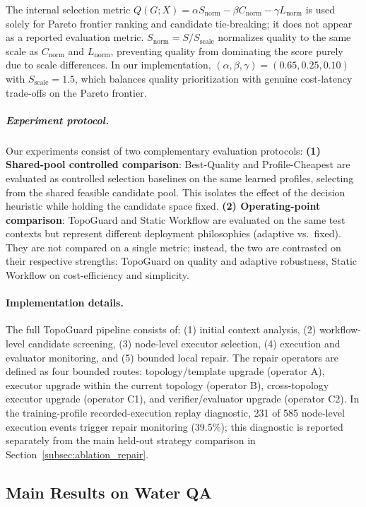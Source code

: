 \documentclass[acmsmall,review,anonymous]{acmart}
\begin{document}
The internal selection metric $Q(G;X)=\alpha S_{\text{norm}}-\beta C_{\text{norm}}-\gamma L_{\text{norm}}$ is used solely for Pareto frontier ranking and candidate tie-breaking; it does not appear as a reported evaluation metric. $S_{\text{norm}}=S / S_{\text{scale}}$ normalizes quality to the same scale as $C_{\text{norm}}$ and $L_{\text{norm}}$, preventing quality from dominating the score purely due to scale differences. In our implementation, $(\alpha,\beta,\gamma)=(0.65,0.25,0.10)$ with $S_{\text{scale}}=1.5$, which balances quality prioritization with genuine cost-latency trade-offs on the Pareto frontier.

\subparagraph{Experiment protocol.}\label{subsubsec:exp_protocol}
Our experiments consist of two complementary evaluation protocols:
\textbf{(1) Shared-pool controlled comparison}: Best-Quality and Profile-Cheapest are evaluated as controlled selection baselines on the same learned profiles, selecting from the shared feasible candidate pool. This isolates the effect of the decision heuristic while holding the candidate space fixed.
\textbf{(2) Operating-point comparison}: TopoGuard and Static Workflow are evaluated on the same test contexts but represent different deployment philosophies (adaptive vs.\ fixed). They are not compared on a single metric; instead, the two are contrasted on their respective strengths: TopoGuard on quality and adaptive robustness, Static Workflow on cost-efficiency and simplicity.

\paragraph{Implementation details.}
The full TopoGuard pipeline consists of: 
(1) initial context analysis, 
(2) workflow-level candidate screening, 
(3) node-level executor selection, 
(4) execution and evaluator monitoring, and 
(5) bounded local repair. 
The repair operators are defined as four bounded routes: topology/template upgrade (operator A), executor upgrade within the current topology (operator B), cross-topology executor upgrade (operator C1), and verifier/evaluator upgrade (operator C2). In the training-profile recorded-execution replay diagnostic, 231 of 585 node-level execution events trigger repair monitoring (39.5\%); this diagnostic is reported separately from the main held-out strategy comparison in Section~\ref{subsec:ablation_repair}.

\subsection{Main Results on Water QA}
\label{subsec:main_results}
\end{document}
